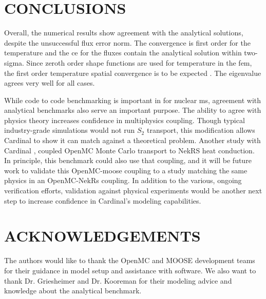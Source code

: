 \documentclass[letterpaper]{mc2023}
\begin{document}
\section{CONCLUSIONS}\label{sec:conclusions}
Overall, the numerical results show agreement with the analytical solutions, despite the unsuccessful flux error norm. The convergence is first order
for the temperature and the \gls{ce} for the fluxes contain the analytical solution within two-sigma. Since zeroth order shape functions are used for
temperature in the \gls{fem}, the first order temperature spatial convergence is to be expected \cite{moose-convergence}. The eigenvalue agrees very
well for all cases.

While code to code benchmarking is important in for nuclear \gls{ms}, agreement with analytical benchmarks also serve an important purpose. The ability
to agree with physics theory increases confidence in multiphysics coupling. Though typical industry-grade simulations would not run $S_{2}$ transport,
this modification allows Cardinal to show it can match against a theoretical problem. Another study with Cardinal \cite{aya2023}, coupled OpenMC Monte
Carlo transport to NekRS heat conduction. In principle, this benchmark could also use that coupling, and it will be future work to validate this
 OpenMC-\gls{moose} coupling to a study matching the same physics in an OpenMC-NekRs coupling. In addition to the various, ongoing verification efforts,
validation against physical experiments would be another next step to increase confidence in Cardinal's modeling capabilities.

\printglossary[title={NOMENCLATURE}, nonumberlist, nopostdot]

\section*{ACKNOWLEDGEMENTS}
The authors would like to thank the OpenMC and MOOSE development teams for their guidance in model setup and assistance
with software. We also want to thank Dr. Griesheimer and Dr. Kooreman for their modeling advice and knowledge about the
analytical benchmark.

\setlength{\baselineskip}{12pt}


\setlength{\baselineskip}{12pt}
\end{document}

